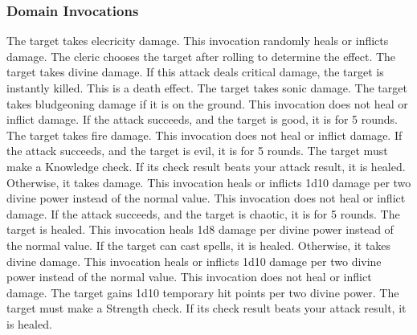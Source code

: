         \subsubsection{Domain Invocations}\label{Domain Invocations}

            The target takes elecricity damage.
            This invocation randomly heals or inflicts damage.
            The cleric chooses the target after rolling to determine the effect.
            The target takes divine damage.
            If this attack deals critical damage, the target is instantly killed.
            This is a death effect.
            The target takes sonic damage.
            The target takes bludgeoning damage if it is on the ground.
            This invocation does not heal or inflict damage.
            If the attack succeeds, and the target is good, it is \staggered for 5 rounds.
            The target takes fire damage.
            This invocation does not heal or inflict damage.
            If the attack succeeds, and the target is evil, it is \dazed for 5 rounds.
            The target must make a Knowledge check.
            If its check result beats your attack result, it is healed.
            Otherwise, it takes damage.
            This invocation heals or inflicts 1d10 damage per two divine power instead of the normal value.
            This invocation does not heal or inflict damage.
            If the attack succeeds, and the target is chaotic, it is \immobilized for 5 rounds.
            The target is healed.
            This invocation heals 1d8 damage per divine power instead of the normal value.
            If the target can cast spells, it is healed.
            Otherwise, it takes divine damage.
            This invocation heals or inflicts 1d10 damage per two divine power instead of the normal value.
            This invocation does not heal or inflict damage.
            The target gains 1d10 temporary hit points per two divine power.
            The target must make a Strength check.
            If its check result beats your attack result, it is healed.
